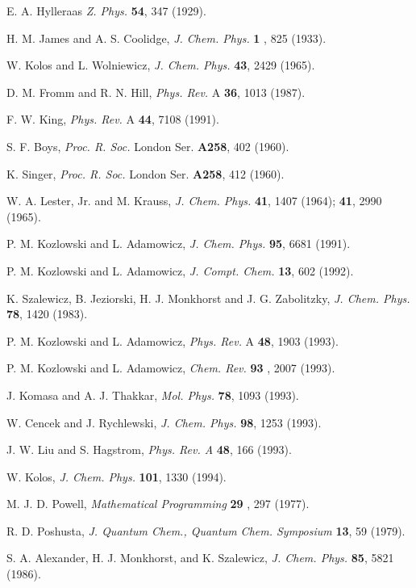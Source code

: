 \begin{thebibliography}{99}
  E. A. Hylleraas {\it Z. Phys.} {\bf 54}, 347 (1929).

  H. M. James and A. S. Coolidge, {\it J. Chem. Phys.} {\bf 1}%
, 825 (1933).

  W. Kolos and L. Wolniewicz, {\it J. Chem. Phys.} {\bf 43},
2429 (1965).

  D. M. Fromm and R. N. Hill, {\it Phys. Rev. }A {\bf 36},
1013 (1987).

  F. W. King, {\it Phys. Rev. }A {\bf 44}, 7108 (1991).

  S. F. Boys, {\it Proc. R. Soc.} London Ser. {\bf A258}, 402
(1960).

  K. Singer, {\it Proc. R. Soc.} London Ser. {\bf A258}, 412
(1960).

  W. A. Lester, Jr. and M. Krauss, {\it J. Chem. Phys.} {\bf %
41}, 1407 (1964); {\bf 41}, 2990 (1965).

  P. M. Kozlowski and L. Adamowicz, {\it J. Chem. Phys.} {\bf %
95}, 6681 (1991).

  P. M. Kozlowski and L. Adamowicz, {\it J. Compt. Chem.} 
{\bf 13}, 602 (1992).

  K. Szalewicz, B. Jeziorski, H. J. Monkhorst and J. G.
Zabolitzky, {\it J. Chem. Phys.} {\bf 78}, 1420 (1983).

  P. M. Kozlowski and L. Adamowicz, {\it Phys. Rev.} A {\bf %
48}, 1903 (1993).

  P. M. Kozlowski and L. Adamowicz, {\it Chem. Rev.} {\bf 93}%
, 2007 (1993).

  J. Komasa and A. J. Thakkar, {\it Mol. Phys.} {\bf 78},
1093 (1993).

  W. Cencek and J. Rychlewski, {\it J. Chem. Phys.} {\bf 98},
1253 (1993).

  J. W. Liu and S. Hagstrom, {\it Phys. Rev. A} {\bf 48}, 166
(1993).

  W. Kolos, {\it J. Chem. Phys.} {\bf 101}, 1330 (1994).

  M. J. D. Powell, {\it Mathematical Programming } {\bf 29}%
, 297 (1977).

  R. D. Poshusta, {\it J. Quantum Chem., Quantum Chem.
Symposium }{\bf 13}, 59 (1979).

  S. A. Alexander, H. J. Monkhorst, and K. Szalewicz, 
{\it J. Chem. Phys. }{\bf 85}, 5821 (1986).


\end{thebibliography}
